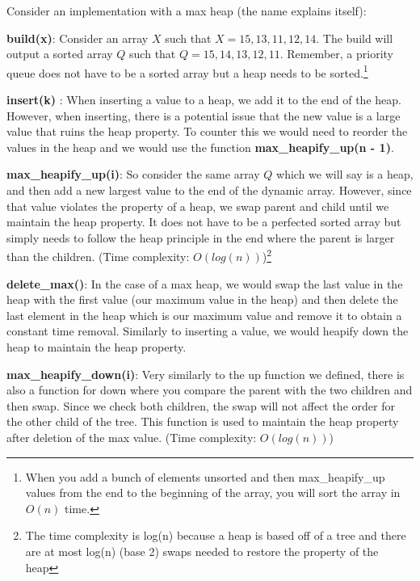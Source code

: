 \documentclass[11pt,a4paper,english]{article}
\begin{document}
Consider an implementation with a max heap (the name explains itself):

\begin{itemize} {

    \item \textbf{build(x)}: Consider an array $X$ such that $X = {15, 13, 11, 12, 14}$. The build will output a sorted array $Q$ such that $Q = {15, 14, 13, 12, 11}$. Remember, a priority queue does not have to be a sorted array but a heap needs to be sorted.\footnote{When you add a bunch of elements unsorted and then max\_heapify\_up values from the end to the beginning of the array, you will sort the array in $O(n)$ time.}

    \item \textbf{insert(k)} : When inserting a value to a heap, we add it to the end of the heap. However, when inserting, there is a potential issue that the new value is a large value that ruins the heap property. To counter this we would need to reorder the values in the heap and we would use the function \textbf{max\_heapify\_up(n - 1)}.


    \item \textbf{max\_heapify\_up(i)}: So consider the same array $Q$ which we will say is a heap, and then add a new largest value to the end of the dynamic array. However, since that value violates the property of a heap, we swap parent and child until we maintain the heap property. It does not have to be a perfected sorted array but simply needs to follow the heap principle in the end where the parent is larger than the children. (Time complexity: $O(log(n))$)\footnote{The time complexity is log(n) because a heap is based off of a tree and there are at most log(n) (base 2) swaps needed to restore the property of the heap}

    \item \textbf{delete\_max()}: In the case of a max heap, we would swap the last value in the heap with the first value (our maximum value in the heap) and then delete the last element in the heap which is our maximum value and remove it to obtain a constant time removal. Similarly to inserting a value, we would heapify down the heap to maintain the heap property.

    \item \textbf{max\_heapify\_down(i)}: Very similarly to the up function we defined, there is also a function for down where you compare the parent with the two children and then swap. Since we check both children, the swap will not affect the order for the other child of the tree. This function is used to maintain the heap property after deletion of the max value. (Time complexity: $O(log(n))$)

}\end{itemize}
\end{document}
